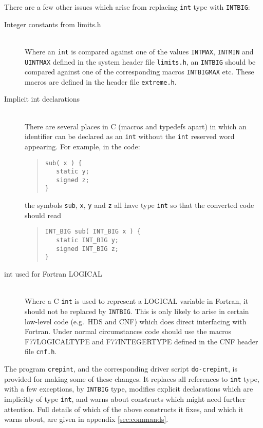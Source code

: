 \documentclass[twoside,11pt]{article}
\newcommand{\htmlref}[2]{#1}
\newcommand{\html}[1]{}
\newcommand{\latexhtml}[2]{#1}
\newcommand{\xref}[3]{#1}
\renewcommand{\_}{\texttt{\symbol{95}}}
\newcommand{\xroutine}[1]{\htmlref{{\tt #1}}{#1}}
\newcommand{\xdofilter}[1]{\htmlref{{\tt do-#1}}{do-xxx}}
\newcommand{\file}[1]{{\tt #1}}
\newcommand{\cc}[1]{{\tt #1}}
\newcommand{\ditem}[1]{\item[#1]\mbox{}\\}
\newenvironment{squote}{\begin{quote}\begin{small}}{\end{small}\end{quote}}
\begin{document}
There are a few other issues which arise from replacing \cc{int} type
with \cc{INT\_BIG}:
\begin{description}
%
\ditem{Integer constants from limits.h}
Where an \cc{int} is compared against one of the values 
\cc{INT\_MAX}, \cc{INT\_MIN} and \cc{UINT\_MAX} 
defined in the system header file \file{limits.h},
an \cc{INT\_BIG} should be compared against one of the corresponding
macros \cc{INT\_BIG\_MAX} etc.
These macros are defined in the header file \file{extreme.h}. 
\html{\begin{squote}\end{squote}}
%
\ditem{Implicit int declarations}
There are several places in C (macros and typedefs apart) 
in which an identifier can be declared
as an \cc{int} without the \cc{int} reserved word appearing.
For example, in the code:
\begin{squote}
\begin{verbatim}
sub( x ) {
   static y;
   signed z;
}
\end{verbatim}
\end{squote}
the symbols \cc{sub}, \cc{x}, \cc{y} and \cc{z} all have type \cc{int}
so that the converted code should read
\begin{squote}
\begin{verbatim}
INT_BIG sub( INT_BIG x ) {
   static INT_BIG y;
   signed INT_BIG z;
}
\end{verbatim}
\end{squote}
%
\ditem{int used for Fortran LOGICAL}
Where a C \cc{int} is used to represent a LOGICAL variable in Fortran,
it should not be replaced by \cc{INT\_BIG}.
This is only likely to arise in certain low-level code 
(e.g.\ \xref{HDS}{sun92}{} and \xref{CNF}{sun209}{}) 
which does direct interfacing with Fortran.
Under normal circumstances code should use the macros
F77\_LOGICAL\_TYPE and F77\_INTEGER\_TYPE defined in the 
CNF header file \file{cnf.h}.
%
\end{description}

The program \xroutine{crepint}, and the corresponding driver script
\xdofilter{crepint}, is provided for making some of these changes.  
It replaces all references to \cc{int} type, with a few exceptions,
by \cc{INT\_BIG} type, modifies explicit declarations which are 
implicitly of type \cc{int}, 
and warns about constructs which might need further attention.
Full details of which of the above constructs it fixes, and which it
warns about, are given in
\latexhtml{appendix \ref{sec:commands}}{\htmlref{the appendix}{crepint}}.
\end{document}
